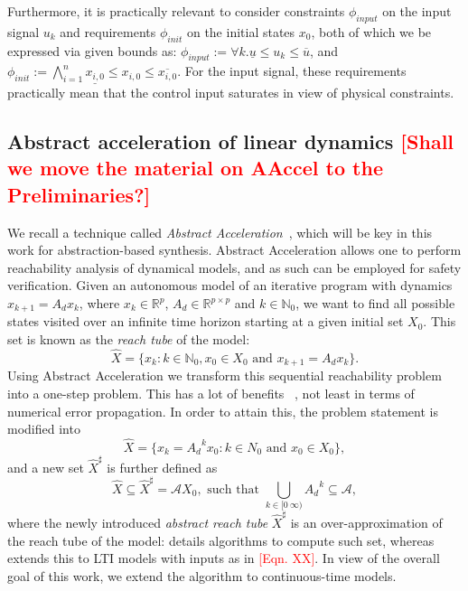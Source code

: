 \documentclass[twocolumn]{autart}    %
\newcommand{\mat}[1]{{#1}}
\renewcommand{\vec}[1]{{#1}}
\renewcommand{\note}[1]{\textcolor{red}{[#1]}}
\begin{document}
Furthermore, it is practically relevant to consider constraints $\phi_\mathit{input}$ on the input
signal $u_{k}$ and requirements $\phi_\mathit{init}$ on the initial states $x_0$, 
both of which we be expressed via given bounds as: 
$\phi_\mathit{input} := {\forall k.\underline{u} \leq u_{k} \leq \overline{u}} $, 
and $\phi_\mathit{init} := \bigwedge_{i=1}^{n} \underline{x_{i,0}} \leq x_{i,0} \leq \overline{x_{i,0}}$. 
For the input signal, these requirements practically mean that the control input saturates in view of physical constraints. 

\subsection{Abstract acceleration of linear dynamics \note{Shall we move the material on AAccel to the Preliminaries?}} 
\label{ssec:aa}
 
We recall a technique called \emph{Abstract Acceleration}~\cite{JSS14,cattaruzza2015unbounded}, 
which will be key in this work for abstraction-based synthesis.  
Abstract Acceleration allows one to perform reachability analysis of dynamical models, 
and as such can be employed for safety verification. 
% 
Given an autonomous model of an iterative program with dynamics 
%
$\vec{x}_{k+1}=\mat{A_d}\vec{x}_k$, 
where $\vec{x}_k \in \mathbb{R}^p$, $\mat{A_d} \in \mathbb{R}^{p \times p}$ and $k \in \mathbb N_0$, 
%
we want to find all possible states visited over an infinite time horizon starting at a given initial set $X_0$.  
This set is known as the \emph{reach tube} of the model: 
%
\begin{equation}
\hat{X} = \{ \vec{x}_k: k \in \mathbb N_0, \vec{x}_0 \in X_0 \text{ and } \vec{x}_{k+1}=\mat{A_d}\vec{x}_k\}.
\end{equation}
%
Using Abstract Acceleration we transform this sequential reachability problem into a one-step problem. 
This has a lot of benefits ~\cite{JSS14}, not least in terms of numerical error propagation.   
In order to attain this, 
the problem statement is modified 
into 
%
\begin{equation}
\hat{X} = \{ \vec{x}_k=\mat{A_d}^k\vec{x}_0: k \in N_0 \text{ and } \vec{x}_0 \in X_0 \}, 
\end{equation}
%
and a new 
set $\hat{X}^\sharp$ is further defined as 
%
\begin{equation}\label{eq:aa_reachtube}
\hat{X} \subseteq \hat{X}^\sharp = \mathcal{A}X_0, \text{ such that } \bigcup_{k \in [0\ \infty)} \mat{A_d}^k \subseteq \mathcal{A}, 
\end{equation}
%
where the newly introduced \emph{abstract reach tube} $\hat{X}^\sharp$ is an
over-approximation of the reach tube of the model: 
\cite{JSS14} details algorithms to compute such set, 
whereas \cite{cattaruzza2015unbounded} extends this to LTI models with inputs as in \note{Eqn. XX}.  
In view of the overall goal of this work, 
we extend the algorithm to continuous-time models.  
\end{document}
